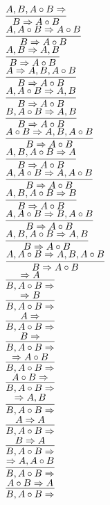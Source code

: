\documentclass[11pt]{article}
\begin{document}
\begin{center}
\bigskip
\\$\infer{B\Rightarrow A\circ B}{A, B, A\circ B\Rightarrow }$
\bigskip
\\$\infer{B\Rightarrow A\circ B}{A, A\circ B\Rightarrow A\circ B}$
\bigskip
\\$\infer{B\Rightarrow A\circ B}{A, B\Rightarrow A, B}$
\bigskip
\\$\infer{B\Rightarrow A\circ B}{A\Rightarrow A, B, A\circ B}$
\bigskip
\\$\infer{B\Rightarrow A\circ B}{A, A\circ B\Rightarrow A, B}$
\bigskip
\\$\infer{B\Rightarrow A\circ B}{B, A\circ B\Rightarrow A, B}$
\bigskip
\\$\infer{B\Rightarrow A\circ B}{A\circ B\Rightarrow A, B, A\circ B}$
\bigskip
\\$\infer{B\Rightarrow A\circ B}{A, B, A\circ B\Rightarrow A}$
\bigskip
\\$\infer{B\Rightarrow A\circ B}{A, A\circ B\Rightarrow A, A\circ B}$
\bigskip
\\$\infer{B\Rightarrow A\circ B}{A, B, A\circ B\Rightarrow B}$
\bigskip
\\$\infer{B\Rightarrow A\circ B}{A, A\circ B\Rightarrow B, A\circ B}$
\bigskip
\\$\infer{B\Rightarrow A\circ B}{A, B, A\circ B\Rightarrow A, B}$
\bigskip
\\$\infer{B\Rightarrow A\circ B}{A, A\circ B\Rightarrow A, B, A\circ B}$
\bigskip
\\$\infer{B, A\circ B\Rightarrow }{\Rightarrow A}$
\bigskip
\\$\infer{B, A\circ B\Rightarrow }{\Rightarrow B}$
\bigskip
\\$\infer{B, A\circ B\Rightarrow }{A\Rightarrow }$
\bigskip
\\$\infer{B, A\circ B\Rightarrow }{B\Rightarrow }$
\bigskip
\\$\infer{B, A\circ B\Rightarrow }{\Rightarrow A\circ B}$
\bigskip
\\$\infer{B, A\circ B\Rightarrow }{A\circ B\Rightarrow }$
\bigskip
\\$\infer{B, A\circ B\Rightarrow }{\Rightarrow A, B}$
\bigskip
\\$\infer{B, A\circ B\Rightarrow }{A\Rightarrow A}$
\bigskip
\\$\infer{B, A\circ B\Rightarrow }{B\Rightarrow A}$
\bigskip
\\$\infer{B, A\circ B\Rightarrow }{\Rightarrow A, A\circ B}$
\bigskip
\\$\infer{B, A\circ B\Rightarrow }{A\circ B\Rightarrow A}$

\end{center}
\end{document}
